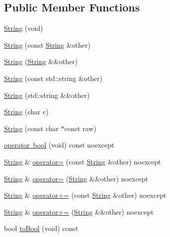 \subsection*{Public Member Functions}
\begin{DoxyCompactItemize}
\item 
\mbox{\hyperlink{classo_a_1_1_string_a10ce41917f151b304f0b465c1ff1ec6e}{String}} (void)
\item 
\mbox{\hyperlink{classo_a_1_1_string_adeb13912c55cdc0406b5960d75d74fb2}{String}} (const \mbox{\hyperlink{classo_a_1_1_string}{String}} \&other)
\item 
\mbox{\hyperlink{classo_a_1_1_string_ae728fbb314314b37c103d3b22ca4c3a9}{String}} (\mbox{\hyperlink{classo_a_1_1_string}{String}} \&\&other)
\item 
\mbox{\hyperlink{classo_a_1_1_string_a7406ec03e50352320d8809a78e12a9fa}{String}} (const std\+::string \&other)
\item 
\mbox{\hyperlink{classo_a_1_1_string_a0b5007bec6fe6f6c8917ecc4febbbd1c}{String}} (std\+::string \&\&other)
\item 
\mbox{\hyperlink{classo_a_1_1_string_a5289dc4246f8adf29ade43156ad4a703}{String}} (char c)
\item 
\mbox{\hyperlink{classo_a_1_1_string_adee64db6ad1f06dc35c6e960811d3734}{String}} (const char $\ast$const raw)
\item 
\mbox{\hyperlink{classo_a_1_1_string_abc7b54346e6c161fb0365336cda41957}{operator bool}} (void) const noexcept
\item 
\mbox{\hyperlink{classo_a_1_1_string}{String}} \& \mbox{\hyperlink{classo_a_1_1_string_ac979bb3953e566011543bd0ebe78e822}{operator=}} (const \mbox{\hyperlink{classo_a_1_1_string}{String}} \&other) noexcept
\item 
\mbox{\hyperlink{classo_a_1_1_string}{String}} \& \mbox{\hyperlink{classo_a_1_1_string_ab45f150390030ee04c119399a4c9fbb7}{operator=}} (\mbox{\hyperlink{classo_a_1_1_string}{String}} \&\&other) noexcept
\item 
\mbox{\hyperlink{classo_a_1_1_string}{String}} \& \mbox{\hyperlink{classo_a_1_1_string_a748a9d3de7d14593f24d5e82fc306413}{operator+=}} (const \mbox{\hyperlink{classo_a_1_1_string}{String}} \&other) noexcept
\item 
\mbox{\hyperlink{classo_a_1_1_string}{String}} \& \mbox{\hyperlink{classo_a_1_1_string_a99849336461c58e51681c68acd1fcafc}{operator+=}} (\mbox{\hyperlink{classo_a_1_1_string}{String}} \&\&other) noexcept
\item 
bool \mbox{\hyperlink{classo_a_1_1_string_a838537de7617a227e77662090f25d5a9}{to\+Bool}} (void) const

\end{DoxyCompactItemize}
